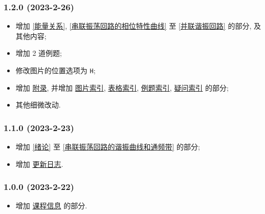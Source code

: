 \subsubsection*{1.2.0 (2023-2-26)}
\begin{itemize}
    \item 增加 \ref{能量关系}, \ref{串联振荡回路的相位特性曲线} 至 \ref{并联谐振回路} 的部分, 及其他内容;
    \item 增加 2 道例题;
    \item 修改图片的位置选项为 \texttt{H};
    \item 增加 \hyperref[附录]{附录}, 并增加 \hyperref[图片索引]{图片索引}, \hyperref[表格索引]{表格索引}, \hyperref[例题索引]{例题索引}, \hyperref[疑问索引]{疑问索引} 的部分;
    \item 其他细微改动.
\end{itemize}

\subsubsection*{1.1.0 (2023-2-23)}
\begin{itemize}
    \item 增加 \ref{绪论} 至 \ref{串联振荡回路的谐振曲线和通频带} 的部分;
    \item 增加 \hyperref[更新日志]{更新日志}.
\end{itemize}

\subsubsection*{1.0.0 (2023-2-22)}
\begin{itemize}
    \item 增加 \hyperref[课程信息]{课程信息} 的部分.
\end{itemize}
